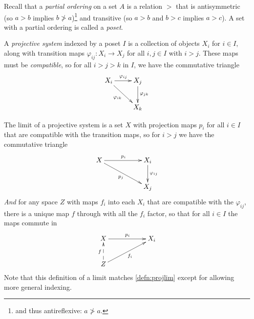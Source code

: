       Recall that a \emph{partial ordering} on a set $A$ is a relation $>$ that is antisymmetric (so $a>b$ implies $b\not>a$)\footnote{and thus antireflexive: $a\not>a$.} and transitive (so $a>b$ and $b>c$ implies $a>c$).
      A set with a partial ordering is called a \emph{poset}.

      A \emph{projective system} indexed by a poset $I$ is a collection of objects $X_i$ for $i\in I$, along with transition maps $\varphi_{ij}:X_i\rightarrow X_j$ for all $i,j\in I$ with $i>j$.
      These maps must be \emph{compatible}, so for all $i>j>k$ in $I$, we have the commutative triangle
      \begin{displaymath}
        \xymatrix{
          X_i \ar[r]^{\varphi_{ij}} \ar[dr]_{\varphi_{ik}} & X_j \ar[d]^{\varphi_{jk}} \\
          & X_k
        }
      \end{displaymath}

      The limit of a projective system is a set $X$ with projection maps $p_i$ for all $i\in I$ that are compatible with the transition maps, so for $i>j$ we have the commutative triangle
      \begin{displaymath}
        \xymatrix{
          X \ar[rr]^{p_i} \ar[drr]_{p_j} && X_i \ar[d]^{\varphi_{ij}} \\
          && X_j
        }
      \end{displaymath}
      \emph{And} for any space $Z$ with maps $f_i$ into each $X_i$ that are compatible with the $\varphi_{ij}$, there is a unique map $f$ through with all the $f_i$ factor, so that for all $i\in I$ the maps commute in
      \begin{displaymath}
        \xymatrix{
          X \ar[rr]^{p_i} && X_i  \\
          Z \ar@{-->}[u]^f \ar[urr]_{f_i} 
        }
      \end{displaymath}
      Note that this definition of a limit matches \cref{defn:projlim} except for allowing more general indexing.

